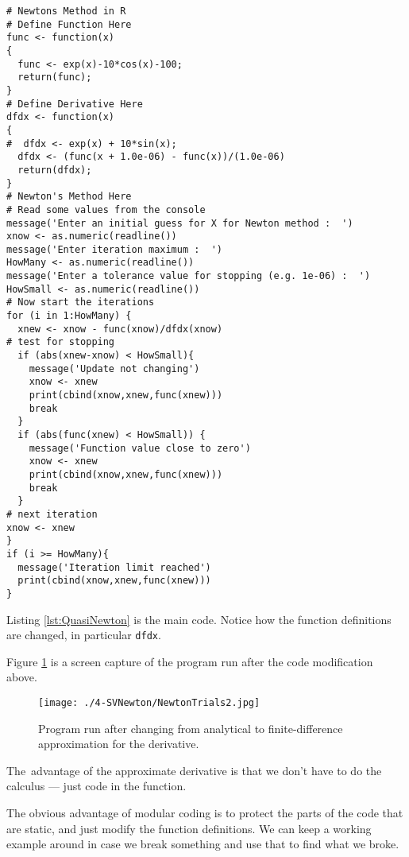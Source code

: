 \begin{lstlisting}[caption=R code demonstrating Newton's Method calculations using finite-difference approximation for the derivative, label=lst:QuasiNewton]
# Newtons Method in R
# Define Function Here
func <- function(x)
{
  func <- exp(x)-10*cos(x)-100;
  return(func);
}
# Define Derivative Here
dfdx <- function(x)
{
#  dfdx <- exp(x) + 10*sin(x); 
  dfdx <- (func(x + 1.0e-06) - func(x))/(1.0e-06)
  return(dfdx);
}
# Newton's Method Here
# Read some values from the console
message('Enter an initial guess for X for Newton method :  ')
xnow <- as.numeric(readline())
message('Enter iteration maximum :  ')
HowMany <- as.numeric(readline())
message('Enter a tolerance value for stopping (e.g. 1e-06) :  ')
HowSmall <- as.numeric(readline())
# Now start the iterations
for (i in 1:HowMany) {
  xnew <- xnow - func(xnow)/dfdx(xnow)
# test for stopping
  if (abs(xnew-xnow) < HowSmall){
    message('Update not changing')
    xnow <- xnew
    print(cbind(xnow,xnew,func(xnew)))
    break
  }
  if (abs(func(xnew) < HowSmall)) {
    message('Function value close to zero')
    xnow <- xnew
    print(cbind(xnow,xnew,func(xnew)))
    break    
  }
# next iteration
xnow <- xnew
}
if (i >= HowMany){
  message('Iteration limit reached')
  print(cbind(xnow,xnew,func(xnew)))
}
\end{lstlisting}



Listing \ref{lst:QuasiNewton} is the main code.  Notice how the function definitions are changed, in particular \texttt{dfdx}.



Figure \ref{fig:NewtonTrials2} is a screen capture of the program run after the code modification above.   
\begin{figure}[h!] %
   \centering
   \texttt{[image: ./4-SVNewton/NewtonTrials2.jpg]} 
   \caption{Program run after changing from analytical to finite-difference approximation for the derivative.}
   \label{fig:NewtonTrials2}
\end{figure}

The~advantage of the approximate derivative is that we don't have to do the calculus --- just code in the function.  

The obvious advantage of modular coding is to protect the parts of the code that are static, and just modify the function definitions.   We can keep a working example around in case we break something and use that to find what we broke.

